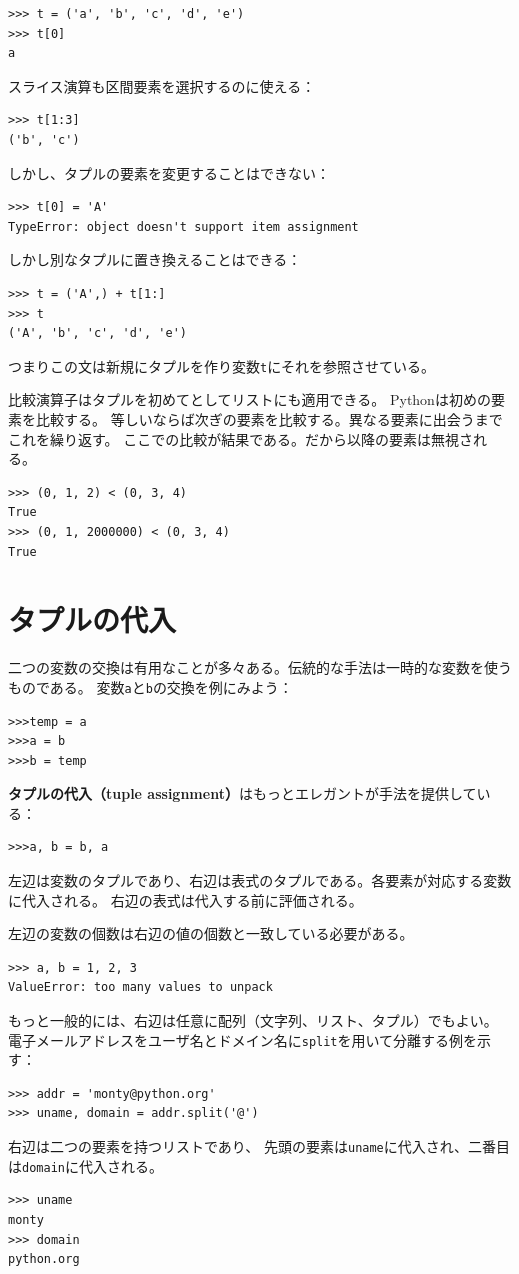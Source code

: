 \documentclass[a4j,12pt,makeidx]{jbook}
\begin{document}
\begin{verbatim}
>>> t = ('a', 'b', 'c', 'd', 'e')
>>> t[0]
a
\end{verbatim}
スライス演算も区間要素を選択するのに使える：
\begin{verbatim}
>>> t[1:3]
('b', 'c')
\end{verbatim}
しかし、タプルの要素を変更することはできない：
\begin{verbatim}
>>> t[0] = 'A'
TypeError: object doesn't support item assignment
\end{verbatim}
しかし別なタプルに置き換えることはできる：
\begin{verbatim}
>>> t = ('A',) + t[1:]
>>> t
('A', 'b', 'c', 'd', 'e')
\end{verbatim}
つまりこの文は新規にタプルを作り変数{\tt t}にそれを参照させている。\par
比較演算子はタプルを初めてとしてリストにも適用できる。
Pythonは初めの要素を比較する。
等しいならば次ぎの要素を比較する。異なる要素に出会うまでこれを繰り返す。
ここでの比較が結果である。だから以降の要素は無視される。
\begin{verbatim}
>>> (0, 1, 2) < (0, 3, 4)
True
>>> (0, 1, 2000000) < (0, 3, 4)
True
\end{verbatim} 
%
\section{タプルの代入}
二つの変数の交換は有用なことが多々ある。伝統的な手法は一時的な変数を使うものである。
変数{\tt a}と{\tt b}の交換を例にみよう：
\begin{verbatim}
>>>temp = a
>>>a = b
>>>b = temp
\end{verbatim}
{\bf タプルの代入（tuple assignment）}はもっとエレガントが手法を提供している：
\begin{verbatim}
>>>a, b = b, a
\end{verbatim}
左辺は変数のタプルであり、右辺は表式のタプルである。各要素が対応する変数に代入される。
右辺の表式は代入する前に評価される。\par
左辺の変数の個数は右辺の値の個数と一致している必要がある。
\begin{verbatim}
>>> a, b = 1, 2, 3
ValueError: too many values to unpack
\end{verbatim} \par
もっと一般的には、右辺は任意に配列（文字列、リスト、タプル）でもよい。
電子メールアドレスをユーザ名とドメイン名に{\tt split}を用いて分離する例を示す：
\begin{verbatim}
>>> addr = 'monty@python.org'
>>> uname, domain = addr.split('@')
\end{verbatim}
右辺は二つの要素を持つリストであり、
先頭の要素は{\tt uname}に代入され、二番目は{\tt domain}に代入される。
\begin{verbatim}
>>> uname
monty
>>> domain
python.org
\end{verbatim}
%
\end{document}
